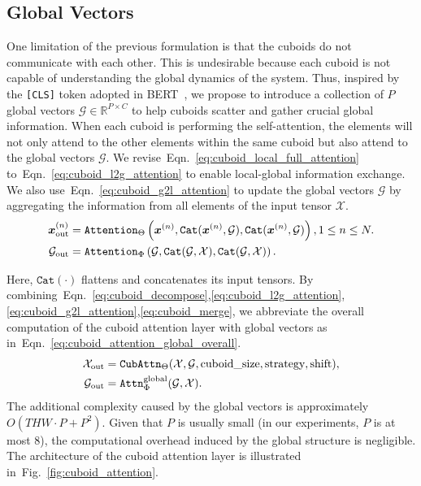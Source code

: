 \documentclass{article}
\newcommand{\figref}[1]{Fig.~\ref{#1}}
\newcommand{\eqnref}[1]{Eqn.~\ref{#1}}
\begin{document}
\subsection{Global Vectors}
One limitation of the previous formulation is that the cuboids do not communicate with each other. This is undesirable because each cuboid is not capable of understanding the global dynamics of the system. Thus, inspired by the \texttt{[CLS]} token adopted in BERT~\cite{devlin2018bert,zaheer2020big}, we propose to introduce a collection of $P$ global vectors $\mathcal{G}\in\mathbb{R}^{P\times C}$ to help cuboids scatter and gather crucial global information. When each cuboid is performing the self-attention, the elements will not only attend to the other elements within the same cuboid but also attend to the global vectors $\mathcal{G}$. 
We revise~\eqnref{eq:cuboid_local_full_attention} to~\eqnref{eq:cuboid_l2g_attention} to enable local-global information exchange. 
We also use~\eqnref{eq:cuboid_g2l_attention} to update the global vectors $\mathcal{G}$ by aggregating the information from all elements of the input tensor $\mathcal{X}$.
\begin{align}
    \centering
    \bm{x}^{(n)}_{\text{out}} &= \mathtt{Attention}_{\Theta}\left(\bm{x}^{(n)}, \mathtt{Cat}(\bm{x}^{(n)},\mathcal{G}), \mathtt{Cat}(\bm{x}^{(n)},\mathcal{G}) \right), 1\leq n\leq N.
    \label{eq:cuboid_l2g_attention} \\
    \mathcal{G}_{\text{out}} &= \mathtt{Attention}_{\Phi}\left(\mathcal{G}, \mathtt{Cat}(\mathcal{G},\mathcal{X}), \mathtt{Cat}(\mathcal{G}, \mathcal{X})\right).
    \label{eq:cuboid_g2l_attention}
\end{align}

Here, $\mathtt{Cat}(\cdot)$ flattens and concatenates its input tensors. 
By combining~\eqnref{eq:cuboid_decompose},\ref{eq:cuboid_l2g_attention},\ref{eq:cuboid_g2l_attention},\ref{eq:cuboid_merge}, we abbreviate the overall computation of the cuboid attention layer with global vectors as in~\eqnref{eq:cuboid_attention_global_overall}.
\begin{align}
    \centering
    \begin{aligned}
    \mathcal{X}_{\text{out}} &= \mathtt{CubAttn}_{\Theta}(\mathcal{X}, \mathcal{G}, \text{cuboid\_size}, \text{strategy}, \text{shift}), \\
    \mathcal{G}_{\text{out}} &= \mathtt{Attn}_{\Phi}^{\text{global}}(\mathcal{G}, \mathcal{X}).
    \end{aligned}
    \label{eq:cuboid_attention_global_overall}
\end{align}
The additional complexity caused by the global vectors is approximately $O\left(THW\cdot P + P^2\right)$. Given that $P$ is usually small (in our experiments, $P$ is at most $8$), the computational overhead induced by the global structure is negligible. The architecture of the cuboid attention layer is illustrated in~\figref{fig:cuboid_attention}.
\end{document}
